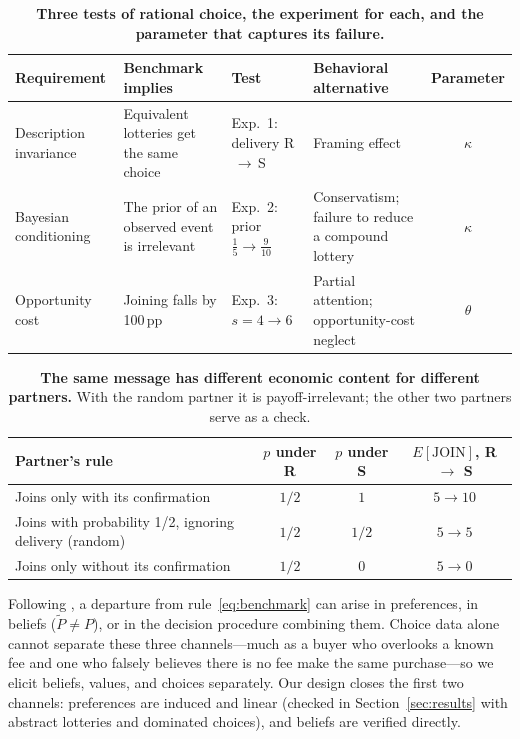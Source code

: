 \documentclass[11pt]{article}
\makeatletter
\renewcommand\subsection{\@startsection{subsection}{2}{\z@}{-1.5ex \@plus -0.6ex \@minus -.2ex}{0.7ex \@plus .2ex}{\normalfont\large\bfseries}}
\makeatother
\begin{document}
\begin{table}[tbp]\centering\small
\begin{tabularx}{\textwidth}{@{}>{\raggedright\arraybackslash}p{2.5cm}Y>{\raggedright\arraybackslash}p{3.3cm}Yc@{}}\toprule
\textbf{Requirement} & \textbf{Benchmark implies} & \textbf{Test} & \textbf{Behavioral alternative} & \textbf{Parameter}\\\midrule
Description invariance & Equivalent lotteries get the same choice & Exp.~1: delivery R$\,\rightarrow\,$S & Framing effect & $\kappa$\\
Bayesian conditioning & The prior of an observed event is irrelevant & Exp.~2: prior $\frac15\rightarrow\frac{9}{10}$ & Conservatism; failure to reduce a compound lottery & $\kappa$\\
Opportunity cost & Joining falls by 100\,pp & Exp.~3: $s=4\rightarrow6$ & Partial attention; opportunity-cost neglect & $\theta$\\\bottomrule
\end{tabularx}
\caption{\textbf{Three tests of rational choice, the experiment for each, and the parameter that captures its failure.}}\label{tab:map}
\end{table}

\begin{table}[tbp]\centering\small
\begin{tabularx}{0.92\textwidth}{@{}Yccc@{}}\toprule
\textbf{Partner's rule} & \textbf{$p$ under R} & \textbf{$p$ under S} & \textbf{$E[\mathrm{JOIN}]$, R $\rightarrow$ S}\\\midrule
Joins only with its confirmation & $1/2$ & $1$ & $5\rightarrow10$\\
Joins with probability 1/2, ignoring delivery (random) & $1/2$ & $1/2$ & $5\rightarrow5$\\
Joins only without its confirmation & $1/2$ & $0$ & $5\rightarrow0$\\\bottomrule
\end{tabularx}
\caption{\textbf{The same message has different economic content for different partners.} With the random partner it is payoff-irrelevant; the other two partners serve as a check.}\label{tab:predictions}
\end{table}

\subsection{A two-step model}
Following \citet{dellavigna2009}, a departure from rule~\eqref{eq:benchmark} can arise in preferences, in beliefs ($\widetilde P\neq P$), or in the decision procedure combining them. Choice data alone cannot separate these three channels---much as a buyer who overlooks a known fee and one who falsely believes there is no fee make the same purchase---so we elicit beliefs, values, and choices separately. Our design closes the first two channels: preferences are induced and linear (checked in Section~\ref{sec:results} with abstract lotteries and dominated choices), and beliefs are verified directly.
\end{document}
